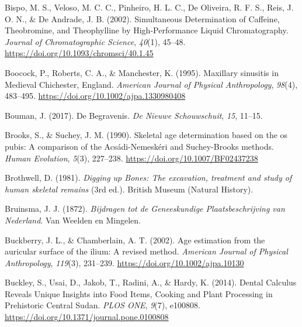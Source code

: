 \documentclass[
  b5paper,
]{book}
\newlength{\cslhangindent}
\newlength{\cslentryspacingunit} %
\newenvironment{CSLReferences}[2] %
 {%
  \setlength{\parindent}{0pt}
  \ifodd #1
  \let\oldpar\par
  \def\par{\hangindent=\cslhangindent\oldpar}
  \fi
  \setlength{\parskip}{#2\cslentryspacingunit}
 }%
 {}
\begin{document}
\begin{CSLReferences}{1}{0}
\leavevmode{}%
Bispo, M. S., Veloso, M. C. C., Pinheiro, H. L. C., De Oliveira, R. F.
S., Reis, J. O. N., \& De Andrade, J. B. (2002). Simultaneous
{Determination} of {Caffeine}, {Theobromine}, and {Theophylline} by
{High-Performance Liquid Chromatography}. \emph{Journal of
Chromatographic Science}, \emph{40}(1), 45--48.
\url{https://doi.org/10.1093/chromsci/40.1.45}

\leavevmode{}%
Boocock, P., Roberts, C. A., \& Manchester, K. (1995). Maxillary
sinusitis in {Medieval Chichester}, {England}. \emph{American Journal of
Physical Anthropology}, \emph{98}(4), 483--495.
\url{https://doi.org/10.1002/ajpa.1330980408}

\leavevmode{}%
Bouman, J. (2017). {De Begravenis}. \emph{De Nieuwe Schouwschuit},
\emph{15}, 11--15.

\leavevmode{}%
Brooks, S., \& Suchey, J. M. (1990). Skeletal age determination based on
the os pubis: {A} comparison of the {Acs{á}di-Nemesk{é}ri} and
{Suchey-Brooks} methods. \emph{Human Evolution}, \emph{5}(3), 227--238.
\url{https://doi.org/10.1007/BF02437238}

\leavevmode{}%
Brothwell, D. (1981). \emph{Digging up {Bones}: {The} excavation,
treatment and study of human skeletal remains} (3rd ed.). {British
Museum (Natural History)}.

\leavevmode{}%
Bruinsma, J. J. (1872). \emph{Bijdragen tot de {Geneeskundige
Plaatsbeschrijving} van {Nederland}}. {Van Weelden en Mingelen}.

\leavevmode{}%
Buckberry, J. L., \& Chamberlain, A. T. (2002). {Age estimation from the
auricular surface of the ilium: A revised method}. \emph{American
Journal of Physical Anthropology}, \emph{119}(3), 231--239.
\url{https://doi.org/10.1002/ajpa.10130}

\leavevmode{}%
Buckley, S., Usai, D., Jakob, T., Radini, A., \& Hardy, K. (2014).
Dental {Calculus Reveals Unique Insights} into {Food Items}, {Cooking}
and {Plant Processing} in {Prehistoric Central Sudan}. \emph{PLOS ONE},
\emph{9}(7), e100808. \url{https://doi.org/10.1371/journal.pone.0100808}


\end{CSLReferences}
\end{document}
